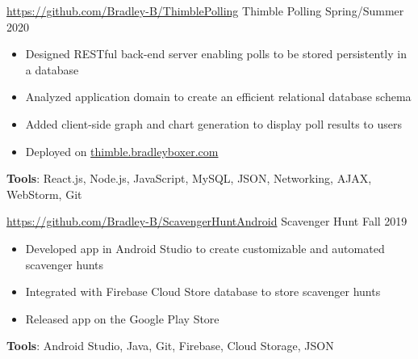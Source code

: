 \documentclass{awesome-cv}
\begin{document}
		\vspace{-0.2cm}

			\vspace{-0.1cm}

		\begin{cventries}
			
			\cventry
				{\href{https://github.com/Bradley-B/ThimblePolling}{https://github.com/Bradley-B/ThimblePolling}}
				{Thimble Polling}
				{Spring/Summer 2020}
				{}
				{
					\vspace{-0.3cm}
					\begin{itemize}[nosep]
						\item Designed RESTful back-end server enabling polls to be stored persistently in a database
						\item Analyzed application domain to create an efficient relational database schema
						\item Added client-side graph and chart generation to display poll results to users
						\item Deployed on \href{https://thimble.bradleyboxer.com}{thimble.bradleyboxer.com}
					\end{itemize}
					\vspace{0.2cm}
					\qquad \textbf{Tools}: React.js, Node.js, JavaScript, MySQL, JSON, Networking, AJAX, WebStorm, Git
				}
		
		
			\cventry
				{\href{https://github.com/Bradley-B/ScavengerHuntAndroid}{https://github.com/Bradley-B/ScavengerHuntAndroid}}
				{Scavenger Hunt}
				{Fall 2019}
				{}
				{
					\vspace{-0.25cm}
					\begin{itemize}[nosep]
						\item Developed app in Android Studio to create customizable and automated scavenger hunts
						\item Integrated with Firebase Cloud Store database to store scavenger hunts 
						\item Released app on the Google Play Store
					\end{itemize}
					\vspace{0.2cm}
					\qquad \textbf{Tools}: Android Studio, Java, Git, Firebase, Cloud Storage, JSON
				}


\end{cventries}
\end{document}
